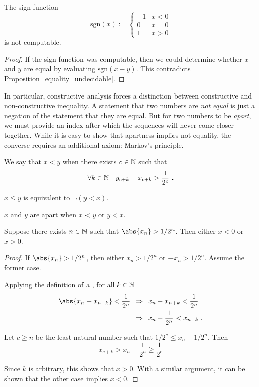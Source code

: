 \documentclass[leqno]{report}
\begin{document}
\begin{Corollary}
    The sign function
    \[
        \mathrm{sgn}(x) := \begin{cases}
            -1 & x < 0 \\
            0 & x = 0 \\
            1 & x > 0
        \end{cases}
    \]
    is not computable.
\end{Corollary}

\begin{proof}
    If the sign function was computable, then we could determine whether $x$ and $y$ are equal by evaluating $\mathrm{sgn}(x - y)$. This contradicts Proposition~\ref{equality_undecidable}.
\end{proof}

In particular, constructive analysis forces a distinction between constructive and non-constructive inequality. A statement that two numbers are \textit{not equal} is just a negation of the statement that they are equal. But for two numbers to be \textit{apart}, we must provide an index after which the sequences will never come closer together. While it is easy to show that apartness implies not-equality, the converse requires an additional axiom: Markov's principle.

\begin{Definition}[Ordering]
    We say that $x < y$ when there exists $c \in \mathbb{N}$ such that
    \[ \forall {k \in \mathbb{N}} \quad {y_{c+k} - x_{c+k} > \frac{1}{2^c}} \ . \]

    $x \leq y$ is equivalent to $\neg (y < x)$.
\end{Definition}

\begin{Definition}[Apartness]
    $x$ and $y$ are apart when $x < y$ or $y < x$.
\end{Definition}

\begin{Lemma} \label{apartness}
    Suppose there exists $n \in \mathbb{N}$ such that $\abs{x_n} > 1/2^n$.
    Then either $x < 0$ or $x > 0$.
\end{Lemma}

\begin{proof}
    If $\abs{x_n} > 1/2^n$, then either $x_n > 1/2^n$ or $-x_n > 1/2^n$. Assume the former case.

    Applying the definition of a \FCCS, for all $k \in \mathbb{N}$
    \begin{align*}
        \abs{x_n - x_{n+k}} < \frac{1}{2^n}
        \enspace&\Rightarrow\enspace x_n - x_{n+k} < \frac{1}{2^n} \\
        \enspace&\Rightarrow\enspace x_n - \frac{1}{2^n} < x_{n+k} \ .
    \end{align*}

    Let $c \geq n$ be the least natural number such that $1/2^c \leq x_n - 1/2^n$. Then
    \[ x_{c+k} > x_n - \frac{1}{2^n} \geq \frac{1}{2^c} \]

    Since $k$ is arbitrary, this shows that $x > 0$. With a similar argument, it can be shown that the other case implies $x < 0$.
\end{proof}
\end{document}
